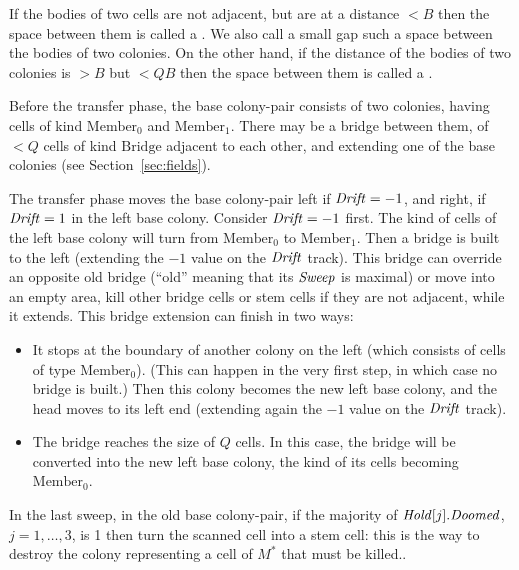 \documentclass[11pt]{memoir}
\theoremstyle{definition} %
\newcommand{\fld}[1]{\ensuremath{\textit{#1\/}}}
\def\B{B}
\newcommand{\Q}{Q} %
\newcommand{\Drift}{\fld{Drift}}
\newcommand{\Doomed}{\fld{Doomed}}
\newcommand{\Hold}{\fld{Hold}}
\newcommand{\Sweep}{\fld{Sweep}} %
\newcommand{\Bridge}{\mathrm{Bridge}}
\newcommand{\Member}{\mathrm{Member}}
\begin{document}
\begin{definition}[Gaps]\label{def:gaps}
If the bodies of two cells are not adjacent, but are at a distance \( <\B \) then the space
between them is called a .
We also call a small gap such a space between the bodies of two colonies.
On the other hand, if the distance of the bodies of two colonies is \( >\B \) 
but \( <\Q\B \) then the space between them is called a .
\end{definition}

Before the transfer phase, the base colony-pair consists of two colonies,
having cells of kind \( \Member_{0} \) and \( \Member_{1} \).
There may be a bridge between them, of \( <\Q \) cells of kind \( \Bridge \)
adjacent to each other, and extending one of the base
colonies (see Section~\ref{sec:fields}).

The transfer phase moves the base colony-pair left if \( \Drift=-1 \), and right, if \( \Drift=1 \)
in the left base colony.
Consider \( \Drift=-1 \) first.
The kind of cells of the left base colony will turn from \( \Member_{0} \) to \( \Member_{1} \).
Then a bridge is built to the left (extending the \( -1 \) value on the \( \Drift \) track).
This bridge can override an opposite old bridge (``old'' meaning 
that its \( \Sweep \) is maximal) or move 
into an empty area, kill other bridge cells or stem cells if they are not adjacent, while it extends.
This bridge extension can finish in two ways:
\begin{itemize}
\item It stops at the boundary of another colony on the left
  (which consists of cells of type \( \Member_{0} \)).
  (This can happen in the very first step, in which case no bridge is built.)
  Then this colony becomes the new left base colony, and the head moves to its left end
  (extending again the \( -1 \) value on the \( \Drift \)  track).
  
\item The bridge reaches the size of \( \Q \) cells.
  In this case, the bridge will be converted into the new left base colony, the kind of its cells
  becoming \( \Member_{0} \).
  \end{itemize}

\begin{sloppypar}
In the last sweep, 
in the old base colony-pair, if the majority of \( \Hold[j].\Doomed \), \( j=1,\dots,3 \), 
is 1 then turn the scanned cell into a stem cell: 
this is the way to destroy the colony representing a cell of \( M^{*} \) that
must be killed..
\end{sloppypar}
\end{document}
